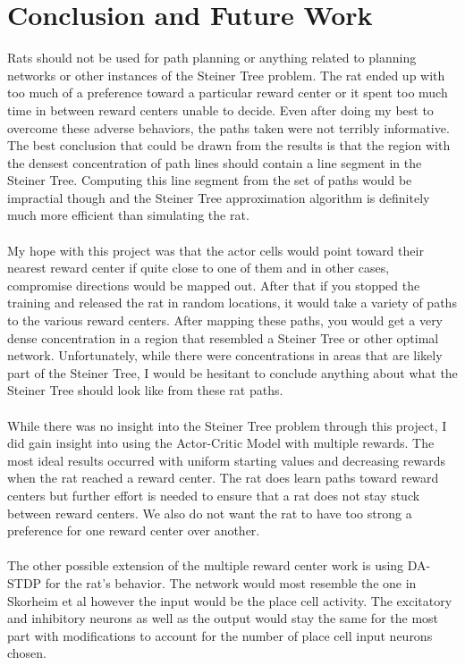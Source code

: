 \documentclass[conference]{IEEEtran}
\begin{document}
\section{Conclusion and Future Work}

Rats should not be used for path planning or anything related to planning networks or other instances of the Steiner Tree problem. The rat ended up with too much of a preference toward a particular reward center or it spent too much time in between reward centers unable to decide. Even after doing my best to overcome these adverse behaviors, the paths taken were not terribly informative. The best conclusion that could be drawn from the results is that the region with the densest concentration of path lines should contain a line segment in the Steiner Tree. Computing this line segment from the set of paths would be impractial though and the Steiner Tree approximation algorithm \cite{steiner1,steiner2} is definitely much more efficient than simulating the rat. \\
\\
My hope with this project was that the actor cells would point toward their nearest reward center if quite close to one of them and in other cases, compromise directions would be mapped out. After that if you stopped the training and released the rat in random locations, it would take a variety of paths to the various reward centers. After mapping these paths, you would get a very dense concentration in a region that resembled a Steiner Tree or other optimal network. Unfortunately, while there were concentrations in areas that are likely part of the Steiner Tree, I would be hesitant to conclude anything about what the Steiner Tree should look like from these rat paths. \\
\\
While there was no insight into the Steiner Tree problem through this project, I did gain insight into using the Actor-Critic Model with multiple rewards. The most ideal results occurred with uniform starting values and decreasing rewards when the rat reached a reward center. The rat does learn paths toward reward centers but further effort is needed to ensure that a rat does not stay stuck between reward centers. We also do not want the rat to have too strong a preference for one reward center over another.\\
\\
The other possible extension of the multiple reward center work is using DA-STDP for the rat's behavior. The network would most resemble the one in Skorheim et al \cite{plosone} however the input would be the place cell activity. The excitatory and inhibitory neurons as well as the output would stay the same for the most part with modifications to account for the number of place cell input neurons chosen.
\end{document}
